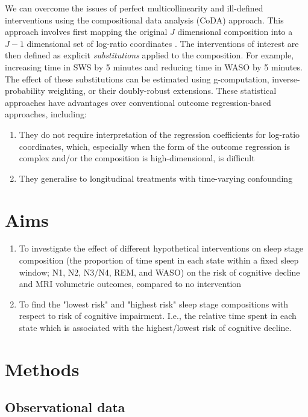\documentclass{article}
\begin{document}
We can overcome the issues of perfect multicollinearity and ill-defined interventions using the compositional data analysis (CoDA) approach. This approach involves first mapping the original $J$ dimensional composition into a $J-1$ dimensional set of log-ratio coordinates \cite{aitchisonStatisticalAnalysisCompositional1982}. The interventions of interest are then defined as explicit \textit{substitutions} applied to the composition. For example, increasing time in SWS by 5 minutes and reducing time in WASO by 5 minutes. The effect of these substitutions can be estimated using g-computation, inverse-probability weighting, or their doubly-robust extensions. These statistical approaches have advantages over conventional outcome regression-based approaches, including:

\begin{enumerate}
    \item They do not require interpretation of the regression coefficients for log-ratio coordinates, which, especially when the form of the outcome regression is complex and/or the composition is high-dimensional, is difficult
    \item They generalise to longitudinal treatments with time-varying confounding
\end{enumerate}

\section{Aims}
\begin{enumerate}
    \item To investigate the effect of different hypothetical interventions on sleep stage composition (the proportion of time spent in each state within a fixed sleep window; N1, N2, N3/N4, REM, and WASO) on the risk of cognitive decline and MRI volumetric outcomes, compared to no intervention
    \item To find the "lowest risk" and "highest risk" sleep stage compositions with respect to risk of cognitive impairment. I.e., the relative time spent in each state which is associated with the highest/lowest risk of cognitive decline.
\end{enumerate}

\section{Methods}

\subsection{Observational data}
\end{document}
